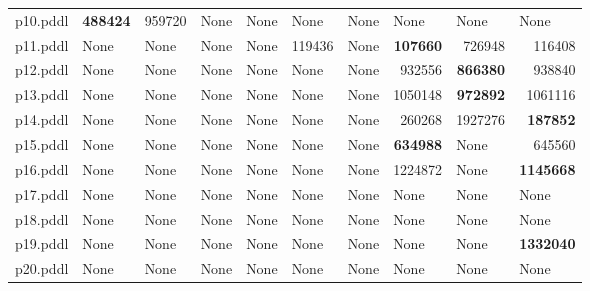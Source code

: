 \documentclass{article}
\begin{document}
\begin{tabular}{@{}lrrrrrrrrr@{}}
p10.pddl & \textbf{488424} & 959720 & \multicolumn{1}{|l|}{None} & \multicolumn{1}{|l|}{None} & \multicolumn{1}{|l|}{None} & \multicolumn{1}{|l|}{None} & \multicolumn{1}{|l|}{None} & \multicolumn{1}{|l|}{None} & \multicolumn{1}{|l|}{None} \\
p11.pddl & \multicolumn{1}{|l|}{None} & \multicolumn{1}{|l|}{None} & \multicolumn{1}{|l|}{None} & \multicolumn{1}{|l|}{None} & 119436 & \multicolumn{1}{|l|}{None} & \textbf{107660} & 726948 & 116408 \\
p12.pddl & \multicolumn{1}{|l|}{None} & \multicolumn{1}{|l|}{None} & \multicolumn{1}{|l|}{None} & \multicolumn{1}{|l|}{None} & \multicolumn{1}{|l|}{None} & \multicolumn{1}{|l|}{None} & 932556 & \textbf{866380} & 938840 \\
p13.pddl & \multicolumn{1}{|l|}{None} & \multicolumn{1}{|l|}{None} & \multicolumn{1}{|l|}{None} & \multicolumn{1}{|l|}{None} & \multicolumn{1}{|l|}{None} & \multicolumn{1}{|l|}{None} & 1050148 & \textbf{972892} & 1061116 \\
p14.pddl & \multicolumn{1}{|l|}{None} & \multicolumn{1}{|l|}{None} & \multicolumn{1}{|l|}{None} & \multicolumn{1}{|l|}{None} & \multicolumn{1}{|l|}{None} & \multicolumn{1}{|l|}{None} & 260268 & 1927276 & \textbf{187852} \\
p15.pddl & \multicolumn{1}{|l|}{None} & \multicolumn{1}{|l|}{None} & \multicolumn{1}{|l|}{None} & \multicolumn{1}{|l|}{None} & \multicolumn{1}{|l|}{None} & \multicolumn{1}{|l|}{None} & \textbf{634988} & \multicolumn{1}{|l|}{None} & 645560 \\
p16.pddl & \multicolumn{1}{|l|}{None} & \multicolumn{1}{|l|}{None} & \multicolumn{1}{|l|}{None} & \multicolumn{1}{|l|}{None} & \multicolumn{1}{|l|}{None} & \multicolumn{1}{|l|}{None} & 1224872 & \multicolumn{1}{|l|}{None} & \textbf{1145668} \\
p17.pddl & \multicolumn{1}{|l|}{None} & \multicolumn{1}{|l|}{None} & \multicolumn{1}{|l|}{None} & \multicolumn{1}{|l|}{None} & \multicolumn{1}{|l|}{None} & \multicolumn{1}{|l|}{None} & \multicolumn{1}{|l|}{None} & \multicolumn{1}{|l|}{None} & \multicolumn{1}{|l|}{None} \\
p18.pddl & \multicolumn{1}{|l|}{None} & \multicolumn{1}{|l|}{None} & \multicolumn{1}{|l|}{None} & \multicolumn{1}{|l|}{None} & \multicolumn{1}{|l|}{None} & \multicolumn{1}{|l|}{None} & \multicolumn{1}{|l|}{None} & \multicolumn{1}{|l|}{None} & \multicolumn{1}{|l|}{None} \\
p19.pddl & \multicolumn{1}{|l|}{None} & \multicolumn{1}{|l|}{None} & \multicolumn{1}{|l|}{None} & \multicolumn{1}{|l|}{None} & \multicolumn{1}{|l|}{None} & \multicolumn{1}{|l|}{None} & \multicolumn{1}{|l|}{None} & \multicolumn{1}{|l|}{None} & \textbf{1332040} \\
p20.pddl & \multicolumn{1}{|l|}{None} & \multicolumn{1}{|l|}{None} & \multicolumn{1}{|l|}{None} & \multicolumn{1}{|l|}{None} & \multicolumn{1}{|l|}{None} & \multicolumn{1}{|l|}{None} & \multicolumn{1}{|l|}{None} & \multicolumn{1}{|l|}{None} & \multicolumn{1}{|l|}{None} \\
\end{tabular}
\end{document}
